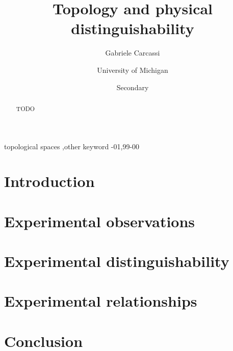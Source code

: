 \documentclass[review]{elsarticle}
\begin{document}
\begin{frontmatter}

\title{Topology and physical distinguishability}

\author{Gabriele Carcassi}
\address{Somewhere, Ann Arbor}

\author[mymainaddress,mysecondaryaddress]{University of Michigan}

\author[mysecondaryaddress]{Secondary}

\address[mymainaddress]{Somewhere else, Ann Arbor}
\address[mysecondaryaddress]{Somewhere instead, Ann Arbor}

\begin{abstract}
TODO
\end{abstract}

\begin{keyword}
topological spaces \sep other keyword
-01\sep  99-00
\end{keyword}

\end{frontmatter}

\linenumbers

\section{Introduction}

\section{Experimental observations}

\section{Experimental distinguishability}

\section{Experimental relationships}

\section{Conclusion}


\end{document}
